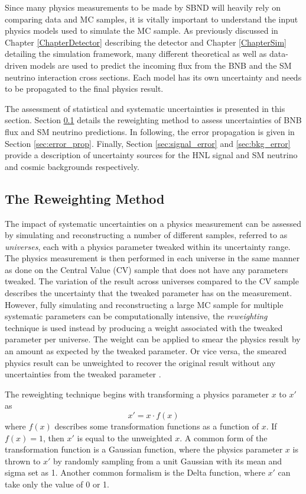 Since many physics measurements to be made by SBND will heavily rely on comparing data and MC samples, it is vitally important to understand the input physics models used to simulate the MC sample.
As previously discussed in Chapter \ref{ChapterDetector} describing the detector and Chapter \ref{ChapterSim} detailing the simulation framework, many different theoretical as well as data-driven models are used to predict the incoming flux from the BNB and the SM neutrino interaction cross sections.
Each model has its own uncertainty and needs to be propagated to the final physics result.

The assessment of statistical and systematic uncertainties is presented in this section.
Section \ref{sec:reweighting} details the reweighting method to assess uncertainties of BNB flux and SM neutrino predictions.
In following, the error propagation is given in Section \ref{sec:error_prop}.
Finally, Section \ref{sec:signal_error} and \ref{sec:bkg_error} provide a description of uncertainty sources for the HNL signal and SM neutrino and cosmic backgrounds respectively.

\subsection{The Reweighting Method}
\label{sec:reweighting}

The impact of systematic uncertainties on a physics measurement can be assessed by simulating and reconstructing a number of different samples, referred to as \textit{universes}, each with a physics parameter tweaked within its uncertainty range.
The physics measurement is then performed in each universe in the same manner as done on the Central Value (CV) sample that does not have any parameters tweaked.
The variation of the result across universes compared to the CV sample describes the uncertainty that the tweaked parameter has on the measurement.
However, fully simulating and reconstructing a large MC sample for multiple systematic parameters can be computationally intensive, the \textit{reweighting} technique is used instead by producing a weight associated with the tweaked parameter per universe.
The weight can be applied to smear the physics result by an amount as expected by the tweaked parameter.
Or vice versa, the smeared physics result can be unweighted to recover the original result without any uncertainties from the tweaked parameter \cite{cowan_stat}.

The reweighting technique begins with transforming a physics parameter $x$ to $x'$ as 
\begin{equation}
	x' = x \cdot f(x)
\end{equation}
where $f(x)$ describes some transformation functions as a function of $x$. 
If $f(x) = 1$, then $x'$ is equal to the unweighted $x$.
A common form of the transformation function  is a Gaussian function, where the physics parameter $x$ is thrown to $x'$ by randomly sampling from a unit Gaussian with its mean and sigma set as 1.
Another common formalism is the Delta function, where $x'$ can take only the value of 0 or 1. 

